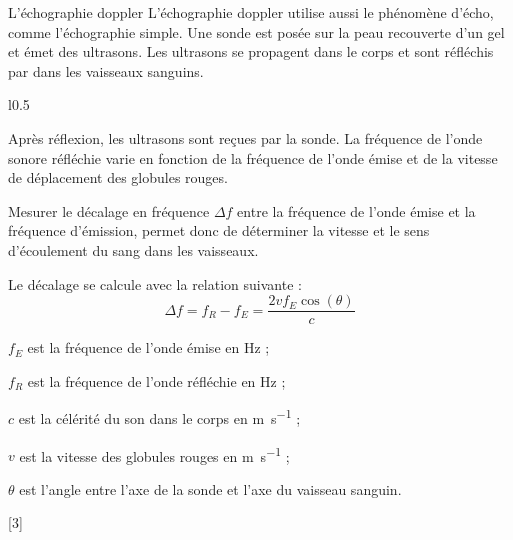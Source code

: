 \begin{doc}{L'échographie doppler}
  L'échographie doppler utilise aussi le phénomène d'écho, comme l'échographie simple.
  Une sonde est posée sur la peau recouverte d'un gel et émet des ultrasons.
  Les ultrasons se propagent dans le corps et sont réfléchis par  dans les vaisseaux sanguins.

  \begin{wrapfigure}[10]{l}{0.5\linewidth}
    \centering
    \vspace*{-10pt}
  \end{wrapfigure}

  Après réflexion, les ultrasons sont reçues par la sonde.
  La fréquence de l'onde sonore réfléchie varie en fonction de la fréquence de l'onde émise et de la vitesse de déplacement des globules rouges.

  Mesurer le décalage en fréquence $\Delta f$ entre la fréquence de l'onde émise et la fréquence d'émission, permet donc de déterminer la vitesse et le sens d'écoulement du sang dans les vaisseaux.
  \vspace*{13pt}

  \begin{importants}
    Le décalage se calcule avec la relation suivante :
    \begin{equation*}
      \Delta f = f_R - f_E = \dfrac{2vf_E \cos(\theta)}{c}
    \end{equation*}
  \end{importants}
  
  \begin{listePoints}[2]
    \item $f_E$ est la fréquence de l'onde émise en \unit{\hertz} ;
    \item $f_R$ est la fréquence de l'onde réfléchie en \unit{\hertz} ;
    \item $c$ est la célérité du son dans le corps en \unit{\m\per\s} ;
    \item $v$ est la vitesse des globules rouges en \unit{\m\per\s} ;
    \item $\theta$ est l'angle entre l'axe de la sonde et l'axe du vaisseau sanguin.
  \end{listePoints}
\end{doc}


[3]


